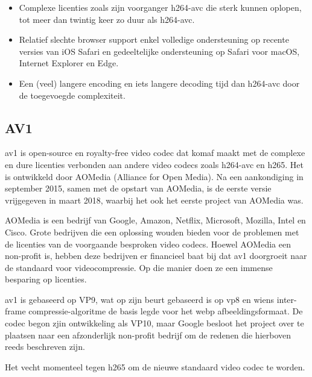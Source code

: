 \begin{itemize}
	
	\item Complexe licenties zoals zijn voorganger \gls{h264-avc} die sterk kunnen oplopen, tot meer dan twintig keer zo duur als \gls{h264-avc}.
	
	\item Relatief slechte browser support enkel volledige ondersteuning op recente versies van iOS Safari en gedeeltelijke ondersteuning op Safari voor macOS, Internet Explorer en Edge.
	
	\item Een (veel) langere \gls{encoding} en iets langere \gls{decoding} tijd dan \gls{h264-avc} door de toegevoegde complexiteit.
	
\end{itemize}

\subsection{AV1}
\label{sec:videocompressie-av1}

\Gls{av1} is \gls{open-source} en royalty-free video \gls{codec} dat komaf maakt met de complexe en dure licenties verbonden aan andere video \glspl{codec} zoals \gls{h264-avc} en \gls{h265}. Het is ontwikkeld door AOMedia (Alliance for Open Media). Na een aankondiging in september 2015, samen met de opstart van AOMedia, is de eerste versie vrijgegeven in maart 2018, waarbij het ook het eerste project van AOMedia was.

AOMedia is een bedrijf van Google, Amazon, Netflix, Microsoft, Mozilla, Intel en Cisco. Grote bedrijven die een oplossing wouden bieden voor de problemen met de licenties van de voorgaande besproken video \glspl{codec}. Hoewel AOMedia een non-profit is, hebben deze bedrijven er financieel baat bij dat \gls{av1} doorgroeit naar de standaard voor \gls{videocompressie}. Op die manier doen ze een immense besparing op licenties.

\Gls{av1} is gebaseerd op VP9, wat op zijn beurt gebaseerd is op \gls{vp8} en wiens \gls{inter-frame} \gls{compressie-algoritme} de basis legde voor het \gls{webp} \gls{afbeeldingsformaat}. De \gls{codec} begon zjin ontwikkeling als VP10, maar Google besloot het project over te plaatsen naar een afzonderlijk non-profit bedrijf om de redenen die hierboven reeds beschreven zijn.

Het vecht momenteel tegen \gls{h265} om de nieuwe standaard video \gls{codec} te worden.


